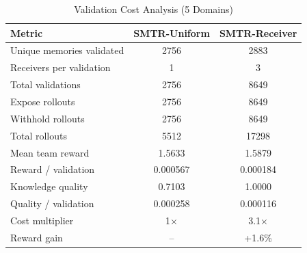 \begin{table}[t]
\caption{Validation Cost Analysis (5 Domains)}
\label{tab:receiver3_cost}
\centering
\begin{tabular}{l c c}
\toprule
Metric & SMTR-Uniform & SMTR-Receiver \\
\midrule
Unique memories validated & 2756 & 2883 \\
Receivers per validation & 1 & 3 \\
Total validations & 2756 & 8649 \\
Expose rollouts & 2756 & 8649 \\
Withhold rollouts & 2756 & 8649 \\
Total rollouts & 5512 & 17298 \\
Mean team reward & 1.5633 & 1.5879 \\
Reward / validation & 0.000567 & 0.000184 \\
Knowledge quality & 0.7103 & 1.0000 \\
Quality / validation & 0.000258 & 0.000116 \\
\midrule
Cost multiplier & 1$\times$ & 3.1$\times$ \\
Reward gain & -- & +1.6\% \\
\bottomrule
\end{tabular}
\end{table}